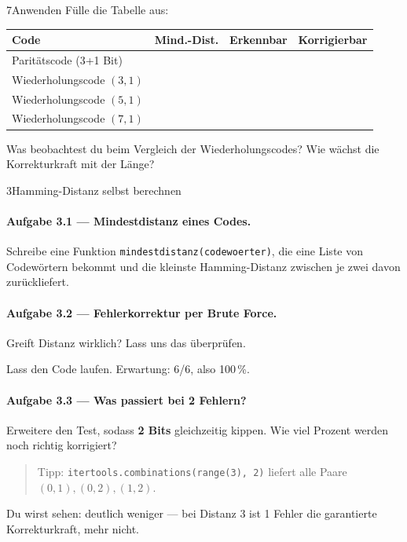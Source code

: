 \begin{bleistiftuebung}{7}{Anwenden}
Fülle die Tabelle aus:

\begin{center}
\small
\setlength{\tabcolsep}{4pt}
\begin{tabular}{l c c c}
  \toprule
  \textbf{Code} & \textbf{Mind.-Dist.} & \textbf{Erkennbar} & \textbf{Korrigierbar} \\
  \midrule
  Paritätscode (3+1 Bit)     & & & \\
  Wiederholungscode $(3,1)$  & & & \\
  Wiederholungscode $(5,1)$  & & & \\
  Wiederholungscode $(7,1)$  & & & \\
  \bottomrule
\end{tabular}
\end{center}

Was beobachtest du beim Vergleich der Wiederholungscodes? Wie wächst
die Korrekturkraft mit der Länge?
\end{bleistiftuebung}

\begin{pythoneinheit}{3}{Hamming-Distanz selbst berechnen}

\paragraph{Aufgabe 3.1 — Mindestdistanz eines Codes.}
Schreibe eine Funktion \texttt{mindestdistanz(codewoerter)}, die eine
Liste von Codewörtern bekommt und die kleinste Hamming-Distanz
zwischen je zwei davon zurückliefert.

\paragraph{Aufgabe 3.2 — Fehlerkorrektur per Brute Force.}
Greift Distanz wirklich? Lass uns das überprüfen.


Lass den Code laufen. Erwartung: 6/6, also 100\,\%.

\paragraph{Aufgabe 3.3 — Was passiert bei 2 Fehlern?}
Erweitere den Test, sodass \textbf{2 Bits} gleichzeitig kippen. Wie
viel Prozent werden noch richtig korrigiert?

\begin{quote}
Tipp: \texttt{itertools.combinations(range(3), 2)} liefert alle Paare
$(0,1), (0,2), (1,2)$.
\end{quote}

Du wirst sehen: deutlich weniger — bei Distanz 3 ist 1 Fehler die
garantierte Korrekturkraft, mehr nicht.
\end{pythoneinheit}

